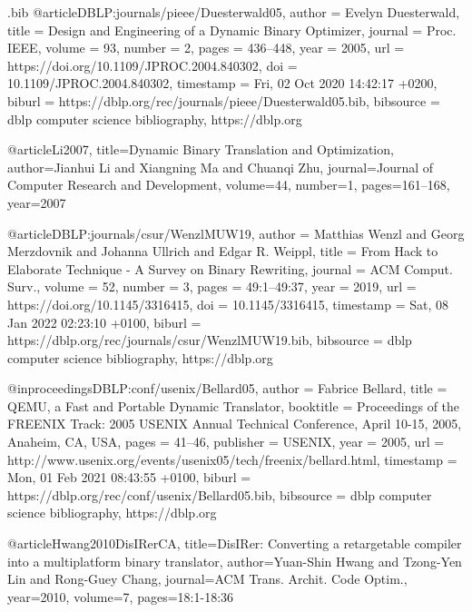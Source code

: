 \begin{filecontents}{\jobname.bib}
@article{DBLP:journals/pieee/Duesterwald05,
  author       = {Evelyn Duesterwald},
  title        = {Design and Engineering of a Dynamic Binary Optimizer},
  journal      = {Proc. {IEEE}},
  volume       = {93},
  number       = {2},
  pages        = {436--448},
  year         = {2005},
  url          = {https://doi.org/10.1109/JPROC.2004.840302},
  doi          = {10.1109/JPROC.2004.840302},
  timestamp    = {Fri, 02 Oct 2020 14:42:17 +0200},
  biburl       = {https://dblp.org/rec/journals/pieee/Duesterwald05.bib},
  bibsource    = {dblp computer science bibliography, https://dblp.org}
}

@article{Li2007,
  title={Dynamic Binary Translation and Optimization},
  author={Jianhui Li and Xiangning Ma and Chuanqi Zhu},
  journal={Journal of Computer Research and Development},
  volume={44},
  number={1},
  pages={161--168},
  year={2007}
}

@article{DBLP:journals/csur/WenzlMUW19,
  author       = {Matthias Wenzl and
                  Georg Merzdovnik and
                  Johanna Ullrich and
                  Edgar R. Weippl},
  title        = {From Hack to Elaborate Technique - {A} Survey on Binary Rewriting},
  journal      = {{ACM} Comput. Surv.},
  volume       = {52},
  number       = {3},
  pages        = {49:1--49:37},
  year         = {2019},
  url          = {https://doi.org/10.1145/3316415},
  doi          = {10.1145/3316415},
  timestamp    = {Sat, 08 Jan 2022 02:23:10 +0100},
  biburl       = {https://dblp.org/rec/journals/csur/WenzlMUW19.bib},
  bibsource    = {dblp computer science bibliography, https://dblp.org}
}

@inproceedings{DBLP:conf/usenix/Bellard05,
  author       = {Fabrice Bellard},
  title        = {QEMU, a Fast and Portable Dynamic Translator},
  booktitle    = {Proceedings of the {FREENIX} Track: 2005 {USENIX} Annual Technical
                  Conference, April 10-15, 2005, Anaheim, CA, {USA}},
  pages        = {41--46},
  publisher    = {{USENIX}},
  year         = {2005},
  url          = {http://www.usenix.org/events/usenix05/tech/freenix/bellard.html},
  timestamp    = {Mon, 01 Feb 2021 08:43:55 +0100},
  biburl       = {https://dblp.org/rec/conf/usenix/Bellard05.bib},
  bibsource    = {dblp computer science bibliography, https://dblp.org}
}

@article{Hwang2010DisIRerCA,
  title={DisIRer: Converting a retargetable compiler into a multiplatform binary translator},
  author={Yuan-Shin Hwang and Tzong-Yen Lin and Rong-Guey Chang},
  journal={ACM Trans. Archit. Code Optim.},
  year={2010},
  volume={7},
  pages={18:1-18:36}
}


\end{filecontents}
